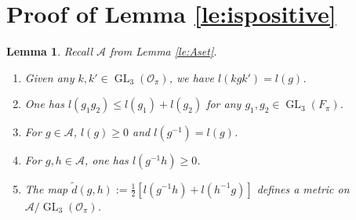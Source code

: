 \documentclass{eptcs}
\newtheorem{lemma}[theorem]{Lemma}
\theoremstyle{remark}
\theoremstyle{definition}
\DeclareMathOperator{\GL}{GL}
\begin{document}
\section{Proof of Lemma \ref{le:ispositive}}
\label{proofoflemma5.3}
\begin{lemma}
  \label{le:ispositive_repeat}
  Recall $\mathcal{A}$ from Lemma \ref{le:Aset}.
  \begin{enumerate}

  \item Given any $k, k' \in \GL_{3}(\mathcal{O}_{\pi})$, we have $l(kgk') = l(g)$.
      \item One has $l(g_{1}g_{2}) \leq l(g_{1}) + l(g_{2})$ for any $g_{1}, g_{2} \in \GL_{3}(F_{\pi})$.
	  \item For $g \in \mathcal{A}$, $l(g) \geq 0$ and $l(g^{-1}) = l(g)$.
	  \item For $g,h \in \mathcal{A}$, one has $l(g^{-1} h) \geq 0$. 
	      \item 
	      The map $\tilde{d}(g,h) :=  \frac{1}{2}[l(g^{-1}h) + l(h^{-1} g)]$ defines a metric on $  \mathcal{A} / \GL_{3}(\mathcal{O}_{\pi})$.
  \end{enumerate}
\end{lemma}
\end{document}
